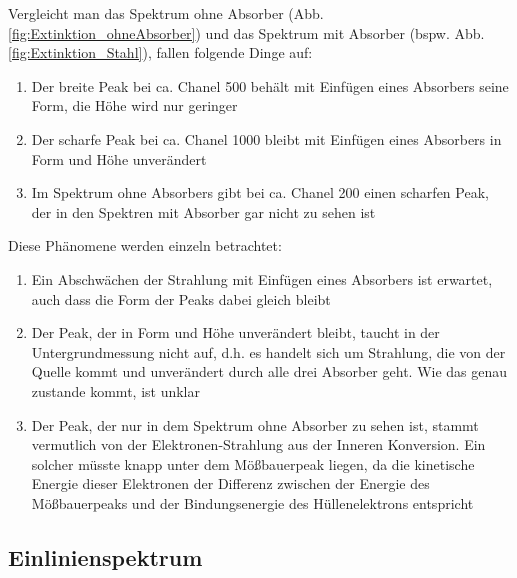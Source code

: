 \documentclass[12pt,a4paper]{article}
\begin{document}
Vergleicht man das Spektrum ohne Absorber (Abb. \ref{fig:Extinktion_ohneAbsorber}) und das Spektrum mit Absorber (bspw. Abb. \ref{fig:Extinktion_Stahl}), fallen folgende Dinge auf:
\begin{enumerate}
\item Der breite Peak bei ca. Chanel 500 behält mit Einfügen eines Absorbers seine Form, die Höhe wird nur geringer
\item Der scharfe Peak bei ca. Chanel 1000 bleibt mit Einfügen eines Absorbers in Form und Höhe unverändert
\item Im Spektrum ohne Absorbers gibt bei ca. Chanel 200 einen scharfen Peak, der in den Spektren mit Absorber gar nicht zu sehen ist
\end{enumerate}
Diese Phänomene werden einzeln betrachtet:
\begin{enumerate}
\item Ein Abschwächen der Strahlung mit Einfügen eines Absorbers ist erwartet, auch dass die Form der Peaks dabei gleich bleibt
\item Der Peak, der in Form und Höhe unverändert bleibt, taucht in der Untergrundmessung nicht auf, d.h. es handelt sich um Strahlung, die von der Quelle kommt und unverändert durch alle drei Absorber geht. Wie das genau zustande kommt, ist unklar
\item Der Peak, der nur in dem Spektrum ohne Absorber zu sehen ist, stammt vermutlich von der Elektronen-Strahlung aus der Inneren Konversion. Ein solcher müsste knapp unter dem Mößbauerpeak liegen, da die kinetische Energie dieser Elektronen der Differenz zwischen der Energie des Mößbauerpeaks und der Bindungsenergie des Hüllenelektrons entspricht
\end{enumerate}


\subsection{Einlinienspektrum}
\end{document}
